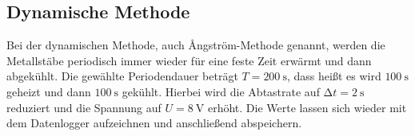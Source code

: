 \subsection{Dynamische Methode}
Bei der dynamischen Methode, auch Ångström-Methode genannt, werden die Metallstäbe periodisch immer wieder für eine feste Zeit erwärmt und dann abgekühlt. Die gewählte Periodendauer beträgt $T = \SI{200}{\second}$, dass heißt es wird $\SI{100}{\second}$ geheizt und dann $\SI{100}{\second}$ gekühlt.  Hierbei wird die Abtastrate auf $\increment t = \SI{2}{\second}$ reduziert und die Spannung auf $U = \SI{8}{\volt}$ erhöht.
Die Werte lassen sich wieder mit dem Datenlogger aufzeichnen und anschließend abspeichern.

